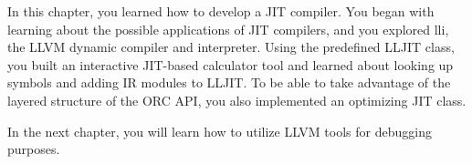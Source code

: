 In this chapter, you learned how to develop a JIT compiler. You began with learning about the possible applications of JIT compilers, and you explored lli, the LLVM dynamic compiler and interpreter. Using the predefined LLJIT class, you built an interactive JIT-based calculator tool and learned about looking up symbols and adding IR modules to LLJIT. To be able to take advantage of the layered structure of the ORC API, you also implemented an optimizing JIT class.

In the next chapter, you will learn how to utilize LLVM tools for debugging purposes.
